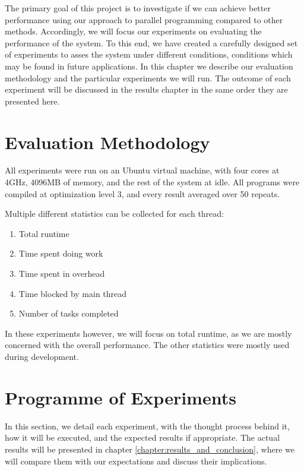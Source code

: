 
\newif\iflabela
\newif\iflabelb
\newif\iflabelc
\newif\iflabeld
\newif\iflabele



The primary goal of this project is to investigate if we can achieve better performance using our approach to parallel programming compared to other methods. Accordingly, we will focus our experiments on evaluating the performance of the system. To this end, we have created a carefully designed set of experiments to asses the system under different conditions, conditions which may be found in future applications. In this chapter we describe our evaluation methodology and the particular experiments we will run. The outcome of each experiment will be discussed in the results chapter in the same order they are presented here.



\section{Evaluation Methodology}

All experiments were run on an Ubuntu virtual machine, with four cores at 4GHz, 4096MB of memory, and the rest of the system at idle. All programs were compiled at optimization level 3, and every result averaged over 50 repeats.

Multiple different statistics can be collected for each thread:

\begin{enumerate}
	\item Total runtime
	\item Time spent doing work
	\item Time spent in overhead
	\item Time blocked by main thread
	\item Number of tasks completed
\end{enumerate}

In these experiments however, we will focus on total runtime, as we are mostly concerned with the overall performance. The other statistics were mostly used during development.



\section{Programme of Experiments}

In this section, we detail each experiment, with the thought process behind it, how it will be executed, and the expected results if appropriate. The actual results will be presented in chapter \ref{chapter:results_and_conclusion}, where we will compare them with our expectations and discuss their implications.

